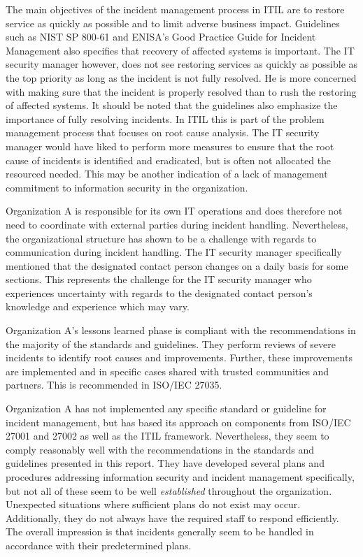 The main objectives of the incident management process in ITIL are to restore service as quickly as possible and to limit adverse business impact. Guidelines such as NIST SP 800-61 and ENISA's Good Practice Guide for Incident Management also specifies that recovery of affected systems is important.  The IT security manager however, does not see restoring services as quickly as possible as the top priority as long as the incident is not fully resolved. He is more concerned with making sure that the incident is properly resolved than to rush the restoring of affected systems. It should be noted that the guidelines also emphasize the importance of fully resolving incidents. In ITIL this is part of the problem management process that focuses on root cause analysis. The IT security manager would have liked to perform more measures to ensure that the root cause of incidents is identified and eradicated, but is often not allocated the resourced needed. This may be another indication of a lack of management commitment to information security in the organization.

Organization A is responsible for its own IT operations and does therefore not need to coordinate with external parties during incident handling. Nevertheless, the organizational structure has shown to be a challenge with regards to communication during incident handling. The IT security manager specifically mentioned that the designated contact person changes on a daily basis for some sections. This represents the challenge for the IT security manager who experiences uncertainty with regards to the designated contact person's knowledge and experience which may vary.

Organization A's lessons learned phase is compliant with the recommendations in the majority of the standards and guidelines. They perform reviews of severe incidents to identify root causes and improvements. Further, these improvements are implemented and in specific cases shared with trusted communities and partners. This is recommended in ISO/IEC 27035. 

Organization A has not implemented any specific standard or guideline for incident management, but has based its approach on components from ISO/IEC 27001 and 27002 as well as the \ac{ITIL} framework. Nevertheless, they seem to comply reasonably well with the recommendations in the standards and guidelines presented in this report. They have developed several plans and procedures addressing information security and incident management specifically, but not all of these seem to be well \textit{established} throughout the organization. Unexpected situations where sufficient plans do not exist may occur. Additionally, they do not always have the required staff to respond efficiently. The overall impression is that incidents generally seem to be handled in accordance with their predetermined plans.


